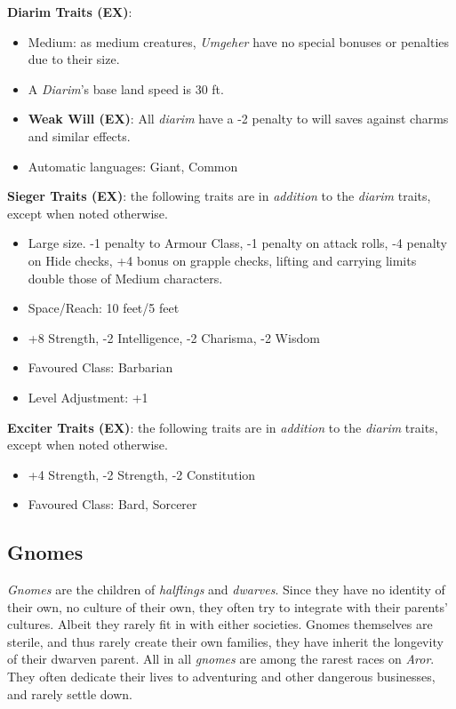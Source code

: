 \begin{35e}
  \textbf{Diarim Traits (EX)}:
  \begin{itemize}[noitemsep]
    \item Medium: as medium creatures, \emph{Umgeher} have no special bonuses or
    penalties due to their size.
    \item A \emph{Diarim}'s base land speed is 30 ft.
    \item \textbf{Weak Will (EX)}: All \emph{diarim} have a -2 penalty to will
    saves against charms and similar effects.
    \item Automatic languages: Giant, Common
  \end{itemize}

  \textbf{Sieger Traits (EX)}: the following traits are in \emph{addition} to
  the \emph{diarim} traits, except when noted otherwise.
  \begin{itemize}[noitemsep]
    \item Large size. -1 penalty to Armour Class, -1 penalty on attack rolls,
    -4 penalty on Hide checks, +4 bonus on grapple checks, lifting and
    carrying limits double those of Medium characters.
    \item Space/Reach: 10 feet/5 feet
    \item +8 Strength, -2 Intelligence, -2 Charisma, -2 Wisdom
    \item Favoured Class: Barbarian
    \item Level Adjustment: +1
  \end{itemize}

  \textbf{Exciter Traits (EX)}: the following traits are in \emph{addition} to
  the \emph{diarim} traits, except when noted otherwise.
  \begin{itemize}[noitemsep]
    \item +4 Strength, -2 Strength, -2 Constitution
    \item Favoured Class: Bard, Sorcerer
  \end{itemize}
\end{35e}

\subsection*{Gnomes}

\emph{Gnomes} are the children of \emph{halflings} and \emph{dwarves}. Since
they have no identity of their own, no culture of their own, they often try to
integrate with their parents' cultures. Albeit they rarely fit in with either
societies. Gnomes themselves are sterile, and thus rarely create their own
families, they have inherit the longevity of their dwarven parent. All in
all \emph{gnomes} are among the rarest races on \emph{Aror}. They often
dedicate their lives to adventuring and other dangerous businesses, and rarely
settle down.

